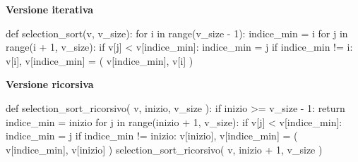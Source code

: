 
\noindent\hspace*{2mm}%
\begin{minipage}[t]{\dimexpr\linewidth/2-4mm\relax}
\vspace{0pt}
\textbf{Versione iterativa}
\begin{unipdcode}[language=Python,
  basicstyle=\ttfamily\scriptsize,
  numbers=none,
  xleftmargin=0pt,
  xrightmargin=0pt,
  framexleftmargin=0.3em]
def selection_sort(v, v_size):
    for i in range(v_size - 1):
        indice_min = i
        for j in range(i + 1, v_size):
            if v[j] < v[indice_min]:
                indice_min = j
        if indice_min != i:
            v[i], v[indice_min] = (
                v[indice_min], v[i]
            )
\end{unipdcode}
\end{minipage}%
\hspace*{4mm}%
\begin{minipage}[t]{\dimexpr\linewidth/2-4mm\relax}
\vspace{0pt}
\textbf{Versione ricorsiva}
\begin{unipdcode}[language=Python,
  basicstyle=\ttfamily\scriptsize,
  numbers=none,
  xleftmargin=0pt,
  xrightmargin=0pt,
  framexleftmargin=0.3em]
def selection_sort_ricorsivo(
    v, inizio, v_size
):
    if inizio >= v_size - 1:
        return
    indice_min = inizio
    for j in range(inizio + 1, v_size):
        if v[j] < v[indice_min]:
            indice_min = j
    if indice_min != inizio:
        v[inizio], v[indice_min] = (
            v[indice_min], v[inizio]
        )
    selection_sort_ricorsivo(
        v, inizio + 1, v_size
    )
\end{unipdcode}
\end{minipage}
